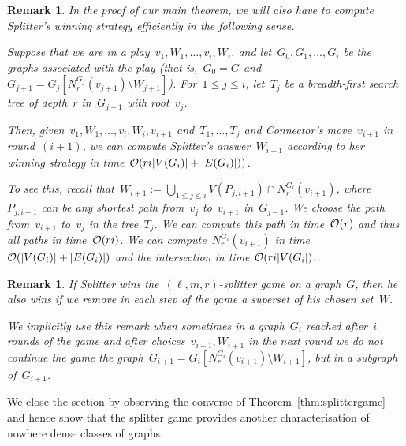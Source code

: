 \documentclass[11pt]{article}
\newtheorem{remark}[theorem]{Remark}
\numberwithin{equation}{section}
\newcommand{\Oof}{\mbox{$\cal O$}}
\begin{document}
\begin{remark}\label{rem:splitterrunningtime}\upshape
  In the proof of our main theorem, we will also have to compute
  Splitter's winning strategy efficiently in the following
  sense. 
  
  {\itshape Suppose that we are in a play~$v_1,W_1,\ldots,v_i,W_i$,
    and let~$G_0,G_1,\ldots,G_i$ be the graphs associated with the
    play (that is,~$G_0=G$
    and~$G_{j+1}=G_j[N_r^{G_j}(v_{j+1})\setminus W_{
      j+1}]$). For~$1\le j\le i$, let~$T_j$ be a breadth-first search
    tree of depth~$r$ in~$G_{j-1}$ with root~$v_j$.
    
    Then, given~$v_1,W_1,\ldots,v_i,W_i,v_{i+1}$ and~$T_1,\ldots,T_j$
    and Connector's move~$v_{i+1}$ in round~$(i+1)$, we can compute
    Splitter's answer~$W_{i+1}$ according to her winning strategy in
    time~$\Oof(ri|V(G_i)|+|E(G_i)|))$.  }

  To see this, recall that~$W_{i+1}:=\bigcup_{1\leq j\leq
    i}V(P_{j,i+1})\cap N_r^{G_{i}}(v_{i+1})$, where~$P_{j,i+1}$ can be
  any shortest path from~$v_j$ to~$v_{i+1}$ in~$G_{j-1}$. We choose
  the path from~$v_{i+1}$ to~$v_j$ in the tree~$T_j$. We can compute
  this path in time~$\Oof(r)$ and thus all paths in time~$\Oof(ri)$. We can
  compute~$N_r^{G_i}(v_{i+1})$ in time~$\Oof(|V(G_i)|+|E(G_i)|)$ and the
  intersection in time $\Oof(ri|V(G_i|)$.
\end{remark}


\begin{remark}\label{lem:splittersuperset}\upshape
  If Splitter wins the~$({\ell},m,r)$-splitter game on a graph~$G$, then he
  also wins if we remove in each step of the game a superset of his
  chosen set~$W$.

  We implicitly use this remark when sometimes in a graph~$G_i$
  reached after~$i$ rounds of the game and after
  choices~$v_{i+1},W_{i+1}$ in the next round we do not continue the
  game the graph~$G_{i+1}=G_i[N_r^{G_i}(v_{i+1})\setminus W_{i+1}]$,
  but in a subgraph of~$G_{i+1}$.
\end{remark}

We close the section by observing the converse of
Theorem~\ref{thm:splittergame} and hence show that the splitter game
provides another characterisation of nowhere dense classes of
graphs. 
\end{document}
